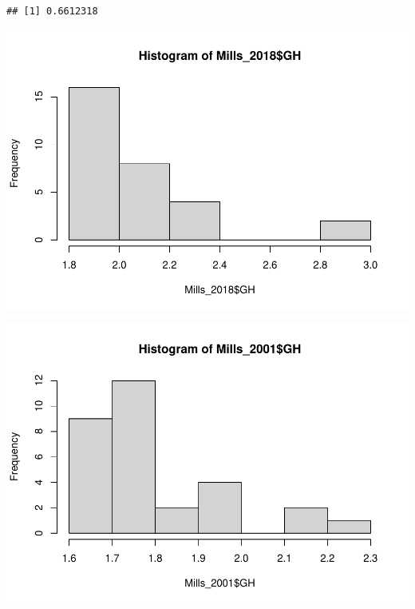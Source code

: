 \documentclass[
  12pt,
]{article}
\newenvironment{Shaded}{\begin{snugshade}}{\end{snugshade}}
\newcommand{\FunctionTok}[1]{\textcolor[rgb]{0.00,0.00,0.00}{#1}}
\newcommand{\NormalTok}[1]{#1}
\newcommand{\SpecialCharTok}[1]{\textcolor[rgb]{0.00,0.00,0.00}{#1}}
\begin{document}
\begin{verbatim}
## [1] 0.6612318
\end{verbatim}

\begin{Shaded}
\end{Shaded}

\includegraphics{Project_Template_files/figure-latex/T-Test-7.pdf}

\begin{Shaded}
\end{Shaded}

\includegraphics{Project_Template_files/figure-latex/T-Test-8.pdf}
\end{document}
